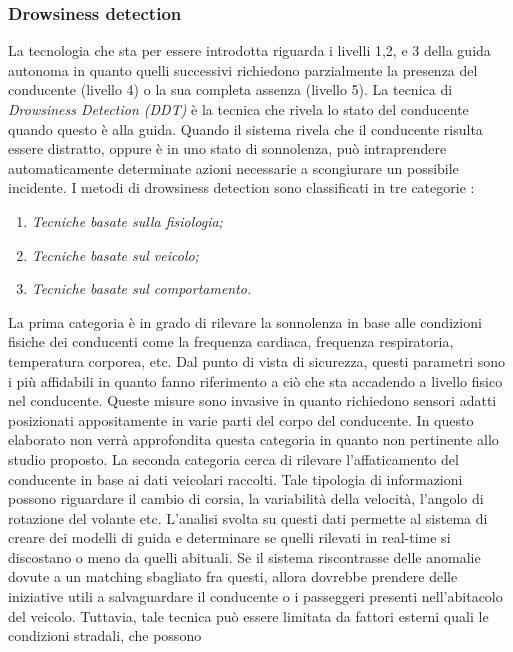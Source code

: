 \subsubsection{Drowsiness detection}
La tecnologia che sta per essere introdotta riguarda i livelli 1,2, e 3 della guida 
autonoma in quanto quelli successivi richiedono parzialmente la presenza 
del conducente (livello 4) o la sua completa assenza (livello 5). La tecnica 
di \emph{Drowsiness Detection (DDT)} è la tecnica che rivela lo stato del conducente 
quando questo è alla guida. Quando il sistema rivela che il conducente risulta 
essere distratto, oppure è in uno stato di sonnolenza, può intraprendere 
automaticamente determinate azioni necessarie a scongiurare un possibile 
incidente. I metodi di drowsiness detection sono classificati in 
tre categorie \cite{drowsiness-detection}:
\begin{enumerate}
    \item \emph{Tecniche basate sulla fisiologia;}
    \item \emph{Tecniche basate sul veicolo;}
    \item \emph{Tecniche basate sul comportamento.}
\end{enumerate}
La prima categoria è in grado di rilevare la sonnolenza in base alle condizioni 
fisiche dei conducenti come la frequenza cardiaca, frequenza respiratoria, 
temperatura corporea, etc. Dal punto di vista di sicurezza, questi parametri 
sono i più affidabili in quanto fanno riferimento a ciò che sta accadendo a livello 
fisico nel conducente. Queste misure sono invasive in quanto richiedono 
sensori adatti posizionati appositamente in varie parti del corpo del conducente. 
In questo elaborato non verrà approfondita questa categoria in quanto 
non pertinente allo studio proposto. La seconda categoria cerca di 
rilevare l'affaticamento del conducente in base ai dati veicolari raccolti. Tale 
tipologia di informazioni possono riguardare il cambio di corsia, la variabilità 
della velocità, l'angolo di rotazione del volante etc. L'analisi svolta su questi 
dati permette al sistema di creare dei modelli di guida e determinare se quelli 
rilevati in real-time si discostano o meno da quelli abituali. Se il sistema 
riscontrasse delle anomalie dovute a un matching sbagliato fra questi, allora 
dovrebbe prendere delle iniziative utili a salvaguardare il conducente o i 
passeggeri presenti nell'abitacolo del veicolo. Tuttavia, tale tecnica può 
essere limitata da fattori esterni quali le condizioni stradali, che possono 
